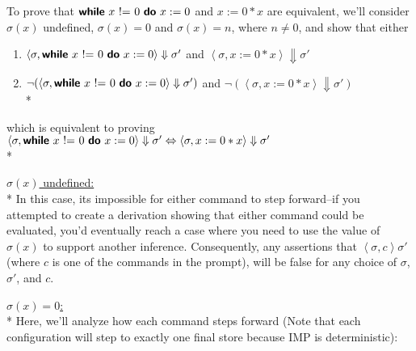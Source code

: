 \documentclass[11pt]{article}
\begin{document}
\begin{exercise}
\begin{enumerate}
To prove that $\while{x~\mathord{!}\mathord{=}~0}{x := 0}$ and $x:= 0 * x$ are equivalent, we'll consider $\sigma(x)$ undefined, $\sigma(x) = 0$ and $\sigma(x) = n$, where $n \neq 0$, and show that either 
\begin{enumerate}
\item $\left< \sigma, \while{x~\mathord{!}\mathord{=}~0}{x := 0} \right> \Downarrow \sigma'$ and $\left< \sigma, x:= 0 * x \right> \Downarrow \sigma'$
\item $\neg(\left< \sigma, \while{x~\mathord{!}\mathord{=}~0}{x := 0} \right> \Downarrow \sigma')$ and $\neg(\left< \sigma, x:= 0 * x \right> \Downarrow \sigma')$ \\*
\end{enumerate}
which is equivalent to proving $\left< \sigma, \while{x~\mathord{!}\mathord{=}~0}{x := 0} \right> \Downarrow \sigma' \Leftrightarrow \left< \sigma, x:= 0 * x \right> \Downarrow \sigma'$\\*


\underline{$\sigma(x)$ undefined:} \\*
In this case, its impossible for either command to step forward--if you attempted to create a derivation showing that either command could be evaluated, you'd eventually reach a case where you need to use the value of $\sigma(x)$ to support another inference. Consequently, any assertions that $\left< \sigma, c \right> \sigma'$ (where $c$ is one of the commands in the prompt), will be false for any choice of $\sigma$, $\sigma'$, and $c$.

\underline{$\sigma(x) = 0$:}\\*
Here, we'll analyze how each command steps forward (Note that each configuration will step to exactly one final store because IMP is deterministic):

\begin{prooftree}
\end{prooftree}

\begin{prooftree}
\end{prooftree}


\end{enumerate}
\end{exercise}
\end{document}
